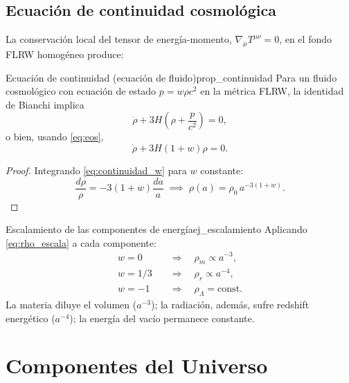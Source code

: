 \subsection{Ecuación de continuidad cosmológica}

La conservación local del tensor de energía-momento, $\nabla_\mu T^{\mu\nu}=0$, en el fondo FLRW homogéneo produce:

\begin{proposicion}{Ecuación de continuidad (ecuación de fluido)}{prop_continuidad}
Para un fluido cosmológico con ecuación de estado $p=w\rho c^2$ en la métrica FLRW, la identidad de Bianchi implica
\begin{equation}
  \dot\rho + 3H\!\left(\rho + \frac{p}{c^2}\right) = 0,
  \label{eq:continuidad}
\end{equation}
o bien, usando \eqref{eq:eos},
\begin{equation}
  \dot\rho + 3H(1+w)\rho = 0.
  \label{eq:continuidad_w}
\end{equation}
\end{proposicion}

\begin{proof}
Integrando \eqref{eq:continuidad_w} para $w$ constante:
\begin{equation}
  \frac{d\rho}{\rho} = -3(1+w)\frac{da}{a}
  \;\implies\;
  \rho(a) = \rho_0\,a^{-3(1+w)}.
  \label{eq:rho_escala}
\end{equation}
\end{proof}

\begin{ejemplo}{Escalamiento de las componentes de energía}{ej_escalamiento}
Aplicando \eqref{eq:rho_escala} a cada componente:
\begin{align}
  w=0 &\quad\Rightarrow\quad \rho_m \propto a^{-3}, \label{eq:rho_m}\\
  w=1/3 &\quad\Rightarrow\quad \rho_r \propto a^{-4}, \label{eq:rho_r}\\
  w=-1 &\quad\Rightarrow\quad \rho_\Lambda = \text{const}. \label{eq:rho_Lambda}
\end{align}
La materia diluye el volumen ($a^{-3}$); la radiación, además, sufre redshift energético ($a^{-4}$); la energía del vacío permanece constante.
\end{ejemplo}

\section{Componentes del Universo}
\label{sec:componentes_universo}

